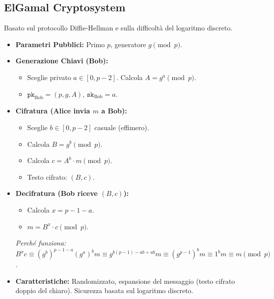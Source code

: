 \subsection{ElGamal Cryptosystem}
Basato sul protocollo Diffie-Hellman e sulla difficoltà del logaritmo discreto.
\begin{itemize}
    \item \textbf{Parametri Pubblici:} Primo $p$, generatore $g \pmod p$.
    \item \textbf{Generazione Chiavi (Bob):}
    \begin{itemize}
        \item Sceglie privato $a \in [0, p-2]$. Calcola $A = g^a \pmod p$.
        \item $\texttt{pk}_{\text{Bob}} = (p, g, A)$, $\texttt{sk}_{\text{Bob}} = a$.
    \end{itemize}
    \item \textbf{Cifratura (Alice invia $m$ a Bob):}
    \begin{itemize}
        \item Sceglie $b \in [0, p-2]$ casuale (effimero).
        \item Calcola $B = g^b \pmod p$.
        \item Calcola $c = A^b \cdot m \pmod p$.
        \item Testo cifrato: $(B, c)$.
    \end{itemize}
    \item \textbf{Decifratura (Bob riceve $(B,c)$):}
    \begin{itemize}
        \item Calcola $x = p-1-a$.
        \item $m = B^x \cdot c \pmod p$.
    \end{itemize}
    \textit{Perché funziona:} $B^x c \equiv (g^b)^{p-1-a} (g^a)^b m \equiv g^{b(p-1)-ab+ab} m \equiv (g^{p-1})^b m \equiv 1^b m \equiv m \pmod p$.
    \item \textbf{Caratteristiche:} Randomizzato, espansione del messaggio (testo cifrato doppio del chiaro). Sicurezza basata sul logaritmo discreto.
\end{itemize}

